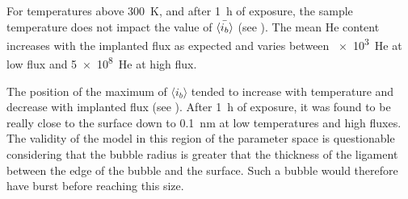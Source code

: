 For temperatures above \SI{300}{K}, and after \SI{1}{h} of exposure, the sample temperature does not impact the value of $\Bar{\langle i_b \rangle}$ (see ).
The mean He content increases with the implanted flux as expected and varies between \SI{e3}{He} at low flux and \SI{5e8}{He} at high flux.

The position of the maximum of $\langle i_b \rangle$ tended to increase with temperature and decrease with implanted flux (see ).
After \SI{1}{h} of exposure, it was found to be really close to the surface down to \SI{0.1}{nm} at low temperatures and high fluxes.
The validity of the model in this region of the parameter space is questionable considering that the bubble radius is greater that the thickness of the ligament between the edge of the bubble and the surface.
Such a bubble would therefore have burst before reaching this size. 

